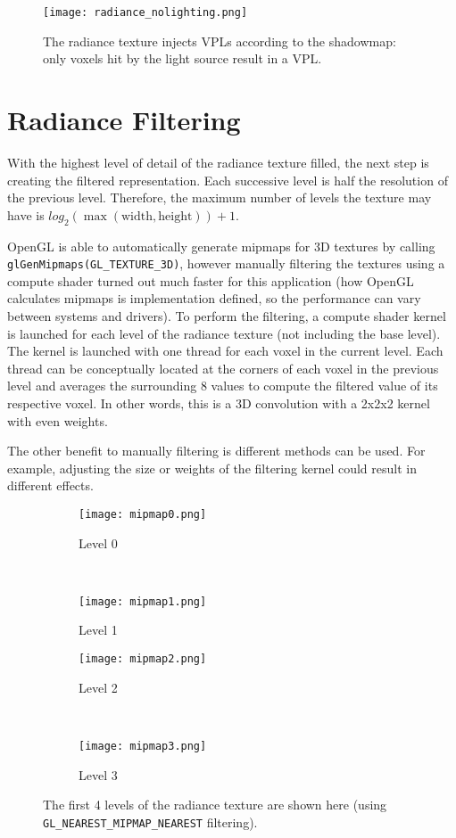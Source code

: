 \begin{figure}[h!]
\centering
    \texttt{[image: radiance\_nolighting.png]}
    \caption{The radiance texture injects VPLs according to the shadowmap: only voxels hit by the light source result in a VPL.}
    \label{fig:radiance}
\end{figure}

\section{Radiance Filtering}
With the highest level of detail of the radiance texture filled, the next step is creating the filtered representation. Each successive level is half the resolution of the previous level. Therefore, the maximum number of levels the texture may have is $log_2 (\max (\text{width}, \text{height})) + 1$.

OpenGL is able to automatically generate mipmaps for 3D textures by calling \verb#glGenMipmaps(GL_TEXTURE_3D)#, however manually filtering the textures using a compute shader turned out much faster for this application (how OpenGL calculates mipmaps is implementation defined, so the performance can vary between systems and drivers). To perform the filtering, a compute shader kernel is launched for each level of the radiance texture (not including the base level). The kernel is launched with one thread for each voxel in the current level. Each thread can be conceptually located at the corners of each voxel in the previous level and averages the surrounding 8 values to compute the filtered value of its respective voxel. In other words, this is a 3D convolution with a 2x2x2 kernel with even weights.

The other benefit to manually filtering is different methods can be used. For example, adjusting the size or weights of the filtering kernel could result in different effects.

\begin{figure}[h!]
\centering
    \begin{subfigure}[t]{0.4\textwidth}
        \texttt{[image: mipmap0.png]}
        \caption{Level 0}
    \end{subfigure}
    ~
    \begin{subfigure}[t]{0.4\textwidth}
        \texttt{[image: mipmap1.png]}
        \caption{Level 1}
    \end{subfigure}
    \begin{subfigure}[t]{0.4\textwidth}
        \texttt{[image: mipmap2.png]}
        \caption{Level 2}
    \end{subfigure}
    ~
    \begin{subfigure}[t]{0.4\textwidth}
        \texttt{[image: mipmap3.png]}
        \caption{Level 3}
    \end{subfigure}
    \caption{The first 4 levels of the radiance texture are shown here (using \texttt{GL\_NEAREST\_MIPMAP\_NEAREST} filtering).}
    \label{fig:radiancefiltered}
\end{figure}

